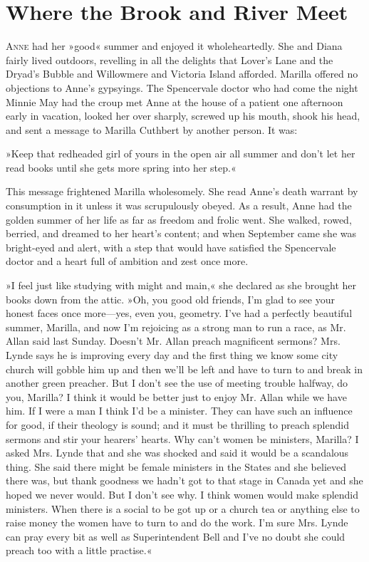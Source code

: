 \chapter{Where the Brook and River Meet}

\lettrine[lines=4]{A}{nne} had her »good« summer and enjoyed it wholeheartedly. She and Diana fairly lived outdoors, revelling in all the delights that Lover’s Lane and the Dryad’s Bubble and Willowmere and Victoria Island afforded. Marilla offered no objections to Anne’s gypsyings. The Spencervale doctor who had come the night Minnie May had the croup met Anne at the house of a patient one afternoon early in vacation, looked her over sharply, screwed up his mouth, shook his head, and sent a message to Marilla Cuthbert by another person. It was:

»Keep that redheaded girl of yours in the open air all summer and don’t let her read books until she gets more spring into her step.«

This message frightened Marilla wholesomely. She read Anne’s death warrant by consumption in it unless it was scrupulously obeyed. As a result, Anne had the golden summer of her life as far as freedom and frolic went. She walked, rowed, berried, and dreamed to her heart’s content; and when September came she was bright-eyed and alert, with a step that would have satisfied the Spencervale doctor and a heart full of ambition and zest once more.

»I feel just like studying with might and main,« she declared as she brought her books down from the attic. »Oh, you good old friends, I’m glad to see your honest faces once more—yes, even you, geometry. I’ve had a perfectly beautiful summer, Marilla, and now I’m rejoicing as a strong man to run a race, as Mr. Allan said last Sunday. Doesn’t Mr. Allan preach magnificent sermons? Mrs. Lynde says he is improving every day and the first thing we know some city church will gobble him up and then we’ll be left and have to turn to and break in another green preacher. But I don’t see the use of meeting trouble halfway, do you, Marilla? I think it would be better just to enjoy Mr. Allan while we have him. If I were a man I think I’d be a minister. They can have such an influence for good, if their theology is sound; and it must be thrilling to preach splendid sermons and stir your hearers’ hearts. Why can’t women be ministers, Marilla? I asked Mrs. Lynde that and she was shocked and said it would be a scandalous thing. She said there might be female ministers in the States and she believed there was, but thank goodness we hadn’t got to that stage in Canada yet and she hoped we never would. But I don’t see why. I think women would make splendid ministers. When there is a social to be got up or a church tea or anything else to raise money the women have to turn to and do the work. I’m sure Mrs. Lynde can pray every bit as well as Superintendent Bell and I’ve no doubt she could preach too with a little practise.«

